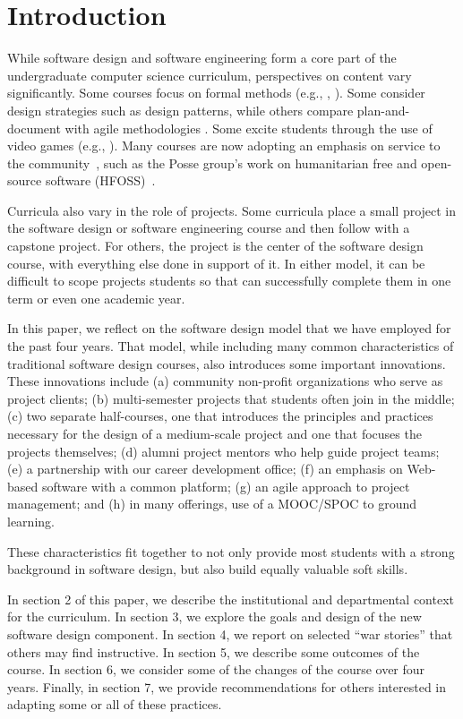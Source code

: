 
\section{Introduction}

While software design and software engineering form a core part of
the undergraduate computer science curriculum, perspectives on 
content vary significantly.  Some courses
focus on formal methods (e.g., \cite{liu-2009}, \cite{garcia-2014}).
Some consider design strategies such as design patterns, while others
compare plan-and-document with agile methodologies
\cite{gestwicki-2018}.  Some excite students through the use of
video games (e.g., \cite{wolz-2007}).  Many courses are now adopting
an emphasis on service to the community~\cite{hfoss-2018}, 
such as the Posse group's work on
humanitarian free and open-source software (HFOSS)~\cite{posse-2018}.

Curricula also vary in the role of projects.  Some curricula place
a small project in the software design or software engineering
course and then follow with a capstone project.  For others,
the project is the center of the software design course, with
everything else done in support of it. In either model, it can be difficult to 
scope projects students so that can successfully complete them
in one term or even one academic year.

In this paper, we reflect on the software design model that we have
employed for the past four years.  That model, while including many
common characteristics of traditional software design courses, also
introduces some important innovations.  These innovations include
(a) community non-profit organizations who serve as project clients;
(b) multi-semester projects that students often join in the middle;
(c) two separate half-courses, one that introduces
the principles and practices necessary for the design of a medium-scale
project and one that focuses the projects themselves; 
(d) alumni project mentors who help guide project teams; 
(e) a partnership with our career development office; 
(f) an emphasis on Web-based software with a common platform; 
(g) an agile approach to project management; and 
(h) in many offerings, use of a MOOC/SPOC to ground learning.

These characteristics fit together to not only provide
most students with a strong background in software design, but also
build equally valuable soft skills.

In section 2 of this paper, we describe the institutional and
departmental context for the curriculum.  In section 3, we explore
the goals and design of the new software design component.  In
section 4, we report on selected ``war stories'' that others may
find instructive.  In section 5, we describe some outcomes of the
course.  In section 6, we consider some of the changes of the course
over four years.  Finally, in section 7, we provide recommendations
for others interested in adapting some or all of these practices.

